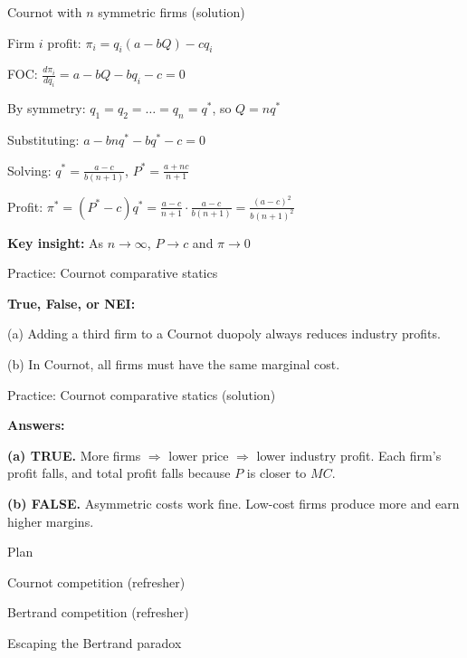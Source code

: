 \documentclass[notes,11pt, aspectratio=169]{beamer}
\newenvironment{wideitemize}{\itemize\addtolength{\itemsep}{10pt}}{\enditemize}
\newenvironment{wideenumerate}{\enumerate\addtolength{\itemsep}{10pt}}{\endenumerate}
\begin{document}
\begin{frame}{Cournot with $n$ symmetric firms (solution)}
	\begin{wideitemize}
		\item Firm $i$ profit: $\pi_i = q_i(a - bQ) - cq_i$
		\item FOC: $\frac{d\pi_i}{dq_i} = a - bQ - bq_i - c = 0$
		\item By symmetry: $q_1 = q_2 = \ldots = q_n = q^*$, so $Q = nq^*$
		\item Substituting: $a - bnq^* - bq^* - c = 0$
		\item Solving: $q^* = \frac{a-c}{b(n+1)}$, \quad $P^* = \frac{a + nc}{n+1}$
		\item Profit: $\pi^* = (P^* - c)q^* = \frac{a-c}{n+1} \cdot \frac{a-c}{b(n+1)} = \frac{(a-c)^2}{b(n+1)^2}$
		\item \textbf{Key insight:} As $n \to \infty$, $P \to c$ and $\pi \to 0$
	\end{wideitemize}
\end{frame}

\begin{frame}{Practice: Cournot comparative statics}
	\begin{wideitemize}
		\item \textbf{True, False, or NEI:}
		\item (a) Adding a third firm to a Cournot duopoly always reduces industry profits.
		\item (b) In Cournot, all firms must have the same marginal cost.
	\end{wideitemize}
\end{frame}

\begin{frame}{Practice: Cournot comparative statics (solution)}
	\begin{wideitemize}
		\item \textbf{Answers:}
		\item \textbf{(a) TRUE.} More firms $\Rightarrow$ lower price $\Rightarrow$ lower industry profit. Each firm's profit falls, and total profit falls because $P$ is closer to $MC$.
		\item \textbf{(b) FALSE.} Asymmetric costs work fine. Low-cost firms produce more and earn higher margins.
	\end{wideitemize}
\end{frame}

\begin{frame}{Plan}
  \begin{wideenumerate}
    \item Cournot competition (refresher)
    \item Bertrand competition (refresher)
    \item Escaping the Bertrand paradox
  \end{wideenumerate}
\end{frame}
\end{document}
